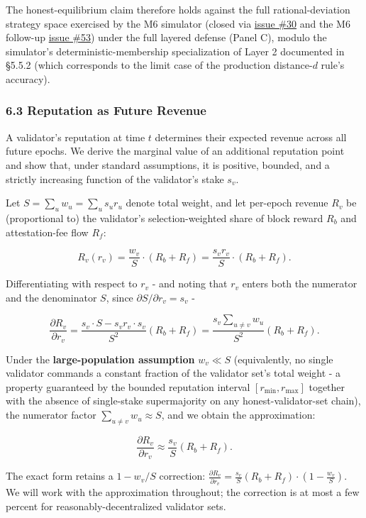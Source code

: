 \documentclass[
  11pt,
]{article}
\begin{document}
The honest-equilibrium claim therefore holds against the full
rational-deviation strategy space exercised by the M6 simulator (closed
via \href{https://github.com/ligate-io/ligate-research/issues/30}{issue
\#30} and the M6 follow-up
\href{https://github.com/ligate-io/ligate-research/issues/53}{issue
\#53}) under the full layered defense (Panel C), modulo the simulator's
deterministic-membership specialization of Layer 2 documented in §5.5.2
(which corresponds to the limit case of the production distance-\(d\)
rule's accuracy).

\subsubsection{6.3 Reputation as Future
Revenue}\label{reputation-as-future-revenue}

A validator's reputation at time \(t\) determines their expected revenue
across all future epochs. We derive the marginal value of an additional
reputation point and show that, under standard assumptions, it is
positive, bounded, and a strictly increasing function of the validator's
stake \(s_v\).

Let \(S = \sum_u w_u = \sum_u s_u r_u\) denote total weight, and let
per-epoch revenue \(R_v\) be (proportional to) the validator's
selection-weighted share of block reward \(R_b\) and attestation-fee
flow \(R_f\):

\[R_v(r_v) = \frac{w_v}{S} \cdot (R_b + R_f) = \frac{s_v r_v}{S} \cdot (R_b + R_f).\]

Differentiating with respect to \(r_v\) - and noting that \(r_v\) enters
both the numerator and the denominator \(S\), since
\(\partial S / \partial r_v = s_v\) -

\[\frac{\partial R_v}{\partial r_v} = \frac{s_v \cdot S - s_v r_v \cdot s_v}{S^2}(R_b + R_f) = \frac{s_v \sum_{u \neq v} w_u}{S^2}(R_b + R_f).\]

Under the \textbf{large-population assumption} \(w_v \ll S\)
(equivalently, no single validator commands a constant fraction of the
validator set's total weight - a property guaranteed by the bounded
reputation interval \([r_{\min}, r_{\max}]\) together with the absence
of single-stake supermajority on any honest-validator-set chain), the
numerator factor \(\sum_{u \neq v} w_u \approx S\), and we obtain the
approximation:

\[\frac{\partial R_v}{\partial r_v} \approx \frac{s_v}{S}(R_b + R_f). \tag{6.3.1}\]

The exact form retains a \(1 - w_v/S\) correction:
\(\frac{\partial R_v}{\partial r_v} = \frac{s_v}{S}(R_b + R_f) \cdot \left(1 - \frac{w_v}{S}\right)\).
We will work with the approximation throughout; the correction is at
most a few percent for reasonably-decentralized validator sets.
\end{document}
